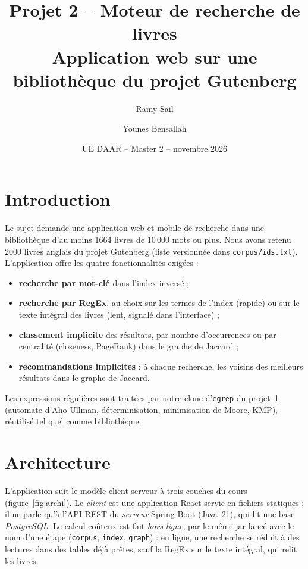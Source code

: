 \documentclass[11pt,a4paper]{article}
\title{Projet 2 -- Moteur de recherche de livres\\[2pt]
  \large Application web sur une bibliothèque du projet Gutenberg}
\author{Ramy Sail \and Younes Bensallah}
\date{UE DAAR -- Master 2 -- novembre 2026}
\begin{document}
\maketitle

\section{Introduction}
\label{sec:intro}

Le sujet demande une application web et mobile de recherche dans une
bibliothèque d'au moins 1664 livres de 10\,000 mots ou plus. Nous avons retenu
2000 livres anglais du projet Gutenberg (liste versionnée dans
\texttt{corpus/ids.txt}). L'application offre les quatre fonctionnalités
exigées :
\begin{itemize}
  \item \textbf{recherche par mot-clé} dans l'index inversé ;
  \item \textbf{recherche par RegEx}, au choix sur les termes de l'index (rapide)
        ou sur le texte intégral des livres (lent, signalé dans l'interface) ;
  \item \textbf{classement implicite} des résultats, par nombre d'occurrences ou
        par centralité (closeness, PageRank) dans le graphe de Jaccard ;
  \item \textbf{recommandations implicites} : à chaque recherche, les voisins des
        meilleurs résultats dans le graphe de Jaccard.
\end{itemize}
Les expressions régulières sont traitées par notre clone d'\texttt{egrep} du
projet~1~\cite{projet1} (automate d'Aho-Ullman, déterminisation, minimisation de Moore, KMP),
réutilisé tel quel comme bibliothèque.

\section{Architecture}
\label{sec:archi}

L'application suit le modèle client-serveur à trois couches du
cours (figure~\ref{fig:archi}). Le \emph{client} est une application React servie en
fichiers statiques ; il ne parle qu'à l'API REST du \emph{serveur} Spring Boot
(Java~21), qui lit une base \emph{PostgreSQL}. Le calcul coûteux est fait
\emph{hors ligne}, par le même jar lancé avec le nom d'une étape
(\texttt{corpus}, \texttt{index}, \texttt{graph}) : en ligne, une recherche se
réduit à des lectures dans des tables déjà prêtes, sauf la RegEx sur le texte
intégral, qui relit les livres.
\end{document}
